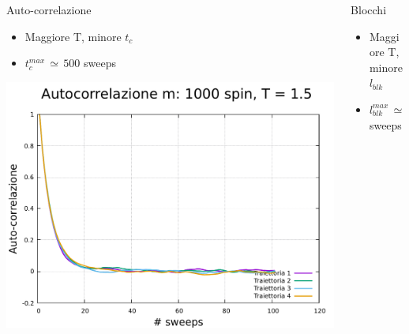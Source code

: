 \begin{frame}
\begin{columns}
        \begin{column}{0.33\textwidth}
            \begin{block}{Auto-correlazione}

                \begin{itemize}[itemsep=0.5em, label=$\diamond$]
                    \item Maggiore T, minore $t_{c}$
                    \item $t_{c}^{max}\,\simeq\,500$ sweeps
                \end{itemize}

                \vspace{0.5cm}

                \centering
                \includegraphics[width=\textwidth]{Immagini/simIsing1D/auto_1000_1.5.pdf}
            
            \end{block}
        \end{column}

        \begin{column}{0.33\textwidth}
            \begin{block}{Blocchi}
                \begin{itemize}[itemsep=0.5em, label=$\diamond$]
                    \item Maggiore T, minore $l_{blk}$
                    \item $l_{blk}^{max}\,\simeq\,1000$ sweeps
                \end{itemize}

                \vspace{0.5cm}


\end{block}
\end{column}
\end{columns}
\end{frame}
